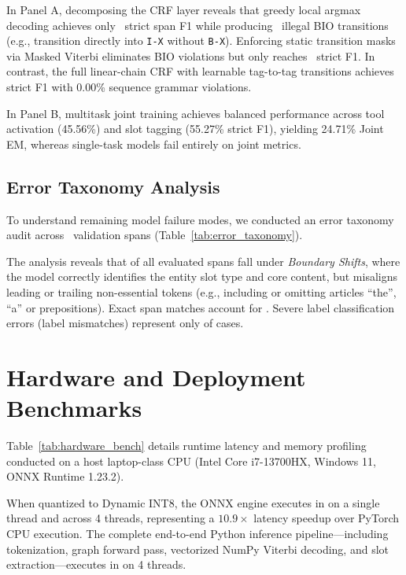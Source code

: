 \documentclass[letterpaper]{article}
\begin{document}
In Panel A, decomposing the CRF layer reveals that greedy local argmax decoding achieves only \CRFGreedyStrictFOne\ strict span F1 while producing \CRFGreedyBIOViolations\ illegal BIO transitions (e.g., transition directly into \texttt{I-X} without \texttt{B-X}). Enforcing static transition masks via Masked Viterbi eliminates BIO violations but only reaches \CRFMaskedViterbiStrictFOne\ strict F1. In contrast, the full linear-chain CRF with learnable tag-to-tag transitions achieves \textbf{\CRFFullStrictFOne} strict F1 with 0.00\% sequence grammar violations.

In Panel B, multitask joint training achieves balanced performance across tool activation (45.56\%) and slot tagging (55.27\% strict F1), yielding 24.71\% Joint EM, whereas single-task models fail entirely on joint metrics.

\subsection{Error Taxonomy Analysis}



To understand remaining model failure modes, we conducted an error taxonomy audit across \TotalErrorSpans\ validation spans (Table~\ref{tab:error_taxonomy}).

The analysis reveals that \textbf{\ErrorBoundaryShiftPct} of all evaluated spans fall under \emph{Boundary Shifts}, where the model correctly identifies the entity slot type and core content, but misaligns leading or trailing non-essential tokens (e.g., including or omitting articles ``the'', ``a'' or prepositions). Exact span matches account for \textbf{\ErrorExactMatchPct}. Severe label classification errors (label mismatches) represent only \textbf{\ErrorLabelMismatchPct} of cases.

\section{Hardware and Deployment Benchmarks}



Table~\ref{tab:hardware_bench} details runtime latency and memory profiling conducted on a host laptop-class CPU (Intel Core i7-13700HX, Windows 11, ONNX Runtime 1.23.2).

When quantized to Dynamic INT8, the ONNX engine executes in \textbf{\ONNXINTOnetTLatencyMean} on a single thread and \textbf{\ONNXINTFourTLatencyMean} across 4 threads, representing a $10.9\times$ latency speedup over PyTorch CPU execution. The complete end-to-end Python inference pipeline---including tokenization, graph forward pass, vectorized NumPy Viterbi decoding, and slot extraction---executes in \textbf{\PipelineFourTLatencyMean} on 4 threads.
\end{document}

